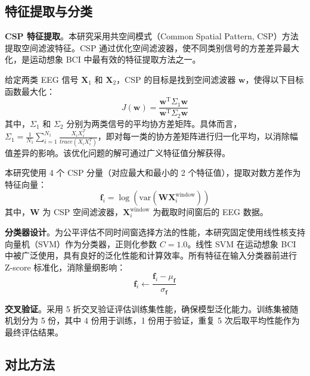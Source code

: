 \subsection{特征提取与分类}
\label{subsec:feature_classification}

\textbf{CSP 特征提取}。本研究采用共空间模式（Common Spatial Pattern, CSP）方法提取空间滤波特征\cite{blankertz2008optimizing, mcfarland1997spatial}。CSP 通过优化空间滤波器，使不同类别信号的方差差异最大化，是运动想象 BCI 中最有效的特征提取方法之一。

给定两类 EEG 信号 $\mathbf{X}_1$ 和 $\mathbf{X}_2$，CSP 的目标是找到空间滤波器 $\mathbf{w}$，使得以下目标函数最大化：
\begin{equation}
J(\mathbf{w}) = \frac{\mathbf{w}^{\text{T}} \Sigma_1 \mathbf{w}}{\mathbf{w}^{\text{T}} \Sigma_2 \mathbf{w}}
\end{equation}
其中，$\Sigma_1$ 和 $\Sigma_2$ 分别为两类信号的平均协方差矩阵。具体而言，$\Sigma_1 = \frac{1}{N_1}\sum_{i=1}^{N_1}\frac{X_iX_i^T}{trace(X_iX_i^T)}$，即对每一类的协方差矩阵进行归一化平均，以消除幅值差异的影响。该优化问题的解可通过广义特征值分解获得。

本研究使用 4 个 CSP 分量（对应最大和最小的 2 个特征值），提取对数方差作为特征向量：
\begin{equation}
\mathbf{f}_i = \log \left( \text{var}(\mathbf{W} \mathbf{X}_i^{\text{window}}) \right)
\end{equation}
其中，$\mathbf{W}$ 为 CSP 空间滤波器，$\mathbf{X}_i^{\text{window}}$ 为截取时间窗后的 EEG 数据。

\textbf{分类器设计}。为公平评估不同时间窗选择方法的性能，本研究固定使用线性核支持向量机（SVM）作为分类器，正则化参数 $C = 1.0$\cite{lotte2007review, pedregosa2011scikit}。线性 SVM 在运动想象 BCI 中被广泛使用，具有良好的泛化性能和计算效率。所有特征在输入分类器前进行 Z-score 标准化，消除量纲影响：
\begin{equation}
\mathbf{f}_i \leftarrow \frac{\mathbf{f}_i - \mu_{\mathbf{f}}}{\sigma_{\mathbf{f}}}
\end{equation}

\textbf{交叉验证}。采用 5 折交叉验证评估训练集性能，确保模型泛化能力\cite{lotte2007review}。训练集被随机划分为 5 份，其中 4 份用于训练，1 份用于验证，重复 5 次后取平均性能作为最终评估结果。

\subsection{对比方法}
\label{subsec:baseline_methods}

